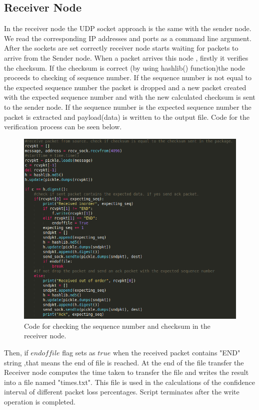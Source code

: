 \documentclass[conference]{IEEEtran}
\begin{document}
\subsection{Receiver Node}
In the receiver node the UDP socket approach is the same with the sender node. We read the corresponding IP addresses and ports as a command line argument. After the sockets are set correctly receiver node starts waiting for packets to arrive from the Sender node. When a packet arrives this node , firstly it verifies the checksum. If the checksum is correct (by using hashlib() function)the node proceeds to checking of sequence number. If the sequence number is not equal to the expected sequence number the packet is dropped and a new packet created with the expected sequence number and with the new calculated checksum is sent to the sender node. If the sequence number is the expected sequence number the packet is extracted and payload(data) is written to the output file. Code for the verification process can be seen below.

\begin{figure}[H]
  \includegraphics[width=\linewidth]{receive_packet.png}
  \caption{Code for checking the sequence number and checksum in the receiver node.}
  \label{fig:receive}
\end{figure}
Then,  if $endoffile$ flag sets as $true$ when the received packet contains "END" string ,that means the end of file is reached. At the end of the file transfer the Receiver node computes the time taken to transfer the file and writes the result into a file named "times.txt". This file is used in the calculations of the confidence interval of different packet loss percentages. Script terminates after the write operation is completed.
\end{document}
